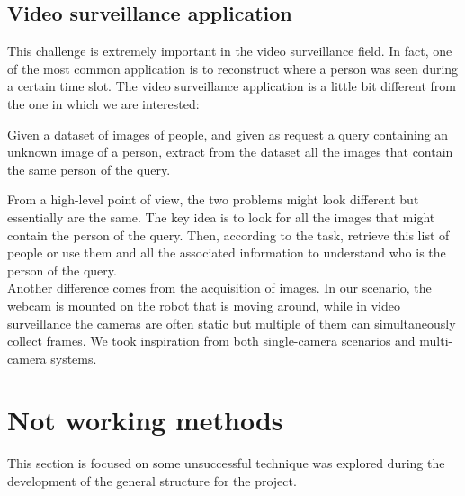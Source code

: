 \subsection{Video surveillance application}
This challenge is extremely important in the video surveillance field. In fact, one of the most common application is to reconstruct where a person was seen during a certain time slot. The video surveillance application is a little bit different from the one in which we are interested:
\begin{tcolorbox}
	\begin{center}
		Given a dataset of images of people, and given as request a query containing an unknown image of a person, extract from the dataset all the images that contain the same person of the query.
	\end{center}
\end{tcolorbox}
From a high-level point of view, the two problems might look different but essentially are the same. The key idea is to look for all the images that might contain the person of the query. Then, according to the task, retrieve this list of people or use them and all the associated information to understand who is the person of the query.\\
Another difference comes from the acquisition of images. In our scenario, the webcam is mounted on the robot that is moving around, while in video surveillance the cameras are often static but multiple of them can simultaneously collect frames. We took inspiration from both single-camera scenarios\cite{reID_withSSN} and multi-camera systems\cite{multiFeatures_reID}.


\section{Not working methods}
This section is focused on some unsuccessful technique was explored during the development of the general structure for the project.


